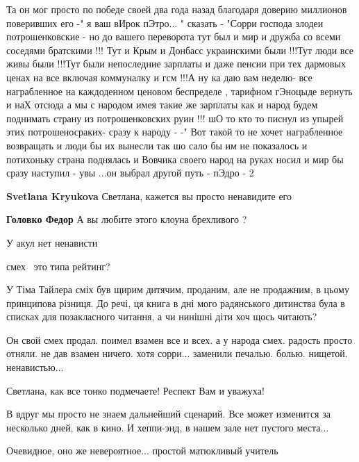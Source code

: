 \begin{itemize}
Та он мог просто по победе своей два года назад благодаря доверию миллионов
поверивших его -" я ваш вИрок пЭтро... " сказать - "Сорри господа злодеи
потрошенковские - но до вашего переворота тут был и мир и дружба со всеми
соседями братскими !!! Тут и Крым и Донбасс украинскими были !!!Тут люди все
живы были !!!Тут были непоследние зарплаты и даже пенсии при тех дармовых ценах
на все включая коммуналку и гсм !!!А ну ка даю вам неделю- все награбленное на
каждоденном ценовом беспределе , тарифном гЭноцыде вернуть и наХ отсюда а мы с
народом имея такие же зарплаты как и народ будем поднимать страну из
потрошенковских руин !!! шО то кто то писнул из упырей этих потрошеносраких-
сразу к народу - -" Вот такой то не хочет награбленное возвращать и люди бы их
вынесли так шо сало бы им не показалось и потихоньку страна поднялась и Вовчика
своего народ на руках носил и мир бы сразу наступил - увы ...он выбрал другой
путь - пЭдро - 2

\textbf{Svetlana Kryukova} Светлана, кажется вы просто ненавидите его

\begin{itemize} %
\textbf{Головко Федор} А вы любите этого клоуна брехливого ?

У акул нет ненависти
\end{itemize} %

смех~ это типа рейтинг?


У Тіма Тайлера сміх був щирим дитячим, проданим, але не продажним, в цьому
принципова різниця. До речі, ця книга в дні мого радянського дитинства була в
списках для позакласного читання, а чи нинішні діти хоч щось читають?



Он свой смех продал. поимел взамен все и всех. а у народа смех. радость просто
отняли. не дав взамен ничего. хотя сорри... заменили
печалью. болью. нищетой. ненавистью...

Светлана, как все тонко подмечаете! Респект Вам и уважуха!


В вдруг мы просто не знаем дальнейший сценарий. Все может изменится за
несколько дней, как в кино. И хеппи-энд, в нашем зале нет пустого места...


Очевидное, оно же невероятное... простой матюкливый учитель


\end{itemize}
